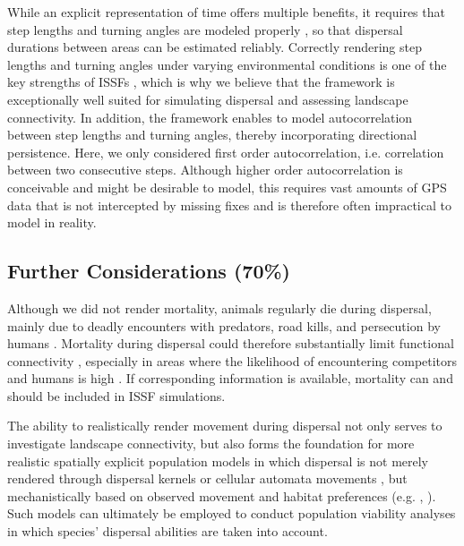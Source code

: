 \documentclass[abstract=on,10pt,a4paper,bibliography=totocnumbered]{article}
\begin{document}
While an explicit representation of time offers multiple benefits, it requires
that step lengths and turning angles are modeled properly
\citep{Kanagaraj.2013}, so that dispersal durations between areas can be
estimated reliably. Correctly rendering step lengths and turning angles under
varying environmental conditions is one of the key strengths of ISSFs
\citep{Avgar.2016, Prokopenko.2017, Fieberg.2020}, which is why we believe that
the framework is exceptionally well suited for simulating dispersal and
assessing landscape connectivity. In addition, the framework enables to model
autocorrelation between step lengths and turning angles, thereby incorporating
directional persistence. Here, we only considered first order autocorrelation,
i.e. correlation between two consecutive steps. Although higher order
autocorrelation is conceivable and might be desirable to model, this requires
vast amounts of GPS data that is not intercepted by missing fixes and is
therefore often impractical to model in reality.

\subsection{Further Considerations (70\%)}
Although we did not render mortality, animals regularly die during dispersal,
mainly due to deadly encounters with predators, road kills, and persecution by
humans \citep{Bonnet.1999, Woodroffe.2012, Behr.2021b}. Mortality during
dispersal could therefore substantially limit functional connectivity
\citep{Bowler.2009}, especially in areas where the likelihood of encountering
competitors and humans is high \citep{Cozzi.2020}. If corresponding information
is available, mortality can and should be included in ISSF simulations.

The ability to realistically render movement during dispersal not only serves to
investigate landscape connectivity, but also forms the foundation for more
realistic spatially explicit population models in which dispersal is not merely
rendered through dispersal kernels or cellular automata movements
\citep{Visintin.2020}, but mechanistically based on observed movement and
habitat preferences (e.g. \citealp{Revilla.2008}, \citealp{Kleinmann.2017}).
Such models can ultimately be employed to conduct population viability analyses
\citep{Boyce.1992} in which species' dispersal abilities are taken into account.
\end{document}
